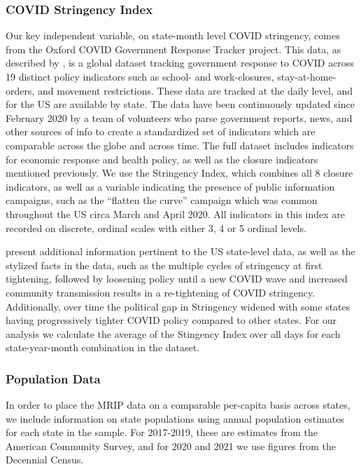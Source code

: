 \documentclass[12pt]{article}
\begin{document}
\subsubsection{COVID Stringency Index}

Our key independent variable, on state-month level COVID stringency,
comes from the Oxford COVID Government Response Tracker project. This
data, as described by \citet{hale2021global}, is a global dataset tracking
government response to COVID across 19 distinct policy indicators such
as school- and work-closures, stay-at-home-orders, and movement
restrictions. These data are tracked at the daily level, and for the US
are available by state. The data have been continuously updated since
February 2020 by a team of volunteers who parse government reports,
news, and other sources of info to create a standardized set of
indicators which are comparable across the globe and across time. The
full dataset includes indicators for economic response and health
policy, as well as the closure indicators mentioned previously. We use the Stringency Index, which combines all 8 closure
indicators, as well as a variable indicating the presence of public
information campaigns, such as the ``flatten the curve'' campaign which
was common throughout the US circa March and April 2020. All indicators
in this index are recorded on discrete, ordinal scales with either 3, 4
or 5 ordinal levels.

\citet{hallas2021Variation} present additional information pertinent to the US
state-level data, as well as the stylized facts in the data, such as the
multiple cycles of stringency at first tightening, followed by loosening
policy until a new COVID wave and increased community transmission
results in a re-tightening of COVID stringency. Additionally, over time
the political gap in Stringency widened with some states
having progressively tighter COVID policy compared to other
states. For our analysis we calculate the average of the Stingency Index over all days
for each state-year-month combination in the dataset.

\subsubsection{Population Data}

In order to place the MRIP data on a comparable per-capita basis across
states, we include information on state populations using annual
population estimates for each state in the sample. For 2017-2019, these
are estimates from the American Community Survey, and for 2020 and 2021
we use figures from the Decennial Census.
\end{document}
